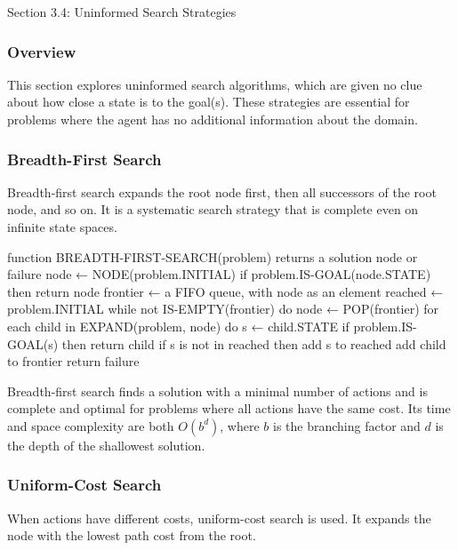 \begin{notes}{Section 3.4: Uninformed Search Strategies}
    \subsubsection*{Overview}

    This section explores uninformed search algorithms, which are given no clue about how close a state is to the goal(s). These strategies are essential for problems where the agent has no additional 
    information about the domain.

    \subsubsection*{Breadth-First Search}

    Breadth-first search expands the root node first, then all successors of the root node, and so on. It is a systematic search strategy that is complete even on infinite state spaces.

    \begin{highlight}
    \begin{code}[Pseudo]
    function BREADTH-FIRST-SEARCH(problem) returns a solution node or failure
        node ← NODE(problem.INITIAL)
        if problem.IS-GOAL(node.STATE) then return node
        frontier ← a FIFO queue, with node as an element
        reached ← {problem.INITIAL}
        while not IS-EMPTY(frontier) do
            node ← POP(frontier)
            for each child in EXPAND(problem, node) do
                s ← child.STATE
                if problem.IS-GOAL(s) then return child
                if s is not in reached then
                    add s to reached
                    add child to frontier
        return failure
    \end{code}
    \end{highlight}

    Breadth-first search finds a solution with a minimal number of actions and is complete and optimal for problems where all actions have the same cost. Its time and space complexity are both 
    $O(b^d)$, where $b$ is the branching factor and $d$ is the depth of the shallowest solution.

    \subsubsection*{Uniform-Cost Search}

    When actions have different costs, uniform-cost search is used. It expands the node with the lowest path cost from the root.


\end{notes}
